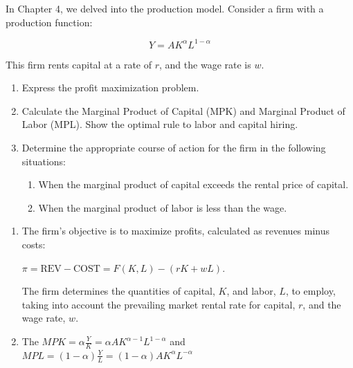 \documentclass[addpoints,ngerman,12pt,answers]{exam}
\begin{document}
	\vspace*{3em}
	
	
	\vspace*{3em}
	\begin{questions}
		
		
		\question In Chapter 4, we delved into the production model. Consider a firm with a production function:
		
		\[Y = AK^{\alpha}L^{1-\alpha}\]
		
		This firm rents capital at a rate of $r$, and the wage rate is $w$.
		
		\begin{enumerate}[label=(\alph*)]
			\item Express the profit maximization problem.
			\item Calculate the Marginal Product of Capital (MPK) and Marginal Product of Labor (MPL). Show the optimal rule to labor and capital hiring.
			\item Determine the appropriate course of action for the firm in the following situations:
			\begin{enumerate}[label=(\roman*)]
				\item When the marginal product of capital exceeds the rental price of capital.
				\item When the marginal product of labor is less than the wage.
			\end{enumerate}
		\end{enumerate}
		
		\clearpage
		\begin{solution}
			\begin{enumerate}[label=(\alph*)]
				\item The firm's objective is to maximize profits, calculated as revenues minus costs:
				
				\(\pi = \text{REV} - \text{COST} = F(K, L) - (rK + wL)\).
				
				The firm determines the quantities of capital, \(K\), and labor, \(L\), to employ, taking into account the prevailing market rental rate for capital, \(r\), and the wage rate, \(w\).
				
				\item The $MPK = \alpha \frac{Y}{K} = \alpha A K^{\alpha - 1} L^{1-\alpha}$ and $MPL= (1-\alpha) \frac{Y}{L}  = (1-\alpha) A K^{\alpha} L^{-\alpha}$
				

\end{enumerate}
\end{solution}
\end{questions}
\end{document}
